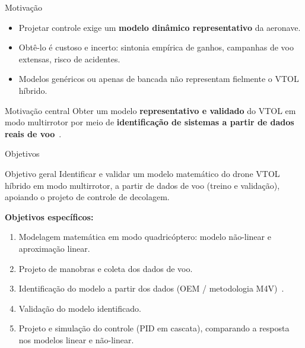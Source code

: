 \documentclass[aspectratio=169,11pt]{beamer}
\begin{document}
\begin{frame}{Motivação}
  \begin{itemize}
    \item Projetar controle exige um \textbf{modelo dinâmico representativo} da aeronave.
    \item Obtê-lo é custoso e incerto: sintonia empírica de ganhos, campanhas de voo extensas, risco de acidentes.
    \item Modelos genéricos ou apenas de bancada não representam fielmente o VTOL híbrido.
  \end{itemize}
  \vfill
  \begin{block}{Motivação central}
    Obter um modelo \textbf{representativo e validado} do VTOL em modo multirrotor por meio de \textbf{identificação de sistemas a partir de dados reais de voo}~\cite{Jategaonkar2015, Aguirre2015}.
  \end{block}
\end{frame}

\begin{frame}{Objetivos}
  \begin{block}{Objetivo geral}
    Identificar e validar um modelo matemático do drone VTOL híbrido em modo multirrotor, a partir de dados de voo (treino e validação), apoiando o projeto de controle de decolagem.
  \end{block}
  \textbf{Objetivos específicos:}
  \begin{enumerate}
    \item Modelagem matemática em modo quadricóptero: modelo não-linear e aproximação linear.
    \item Projeto de manobras e coleta dos dados de voo.
    \item Identificação do modelo a partir dos dados (OEM / metodologia M4V)~\cite{Jategaonkar2015}.
    \item Validação do modelo identificado.
    \item Projeto e simulação do controle (PID em cascata), comparando a resposta nos modelos linear e não-linear.
  \end{enumerate}
\end{frame}

\end{document}
